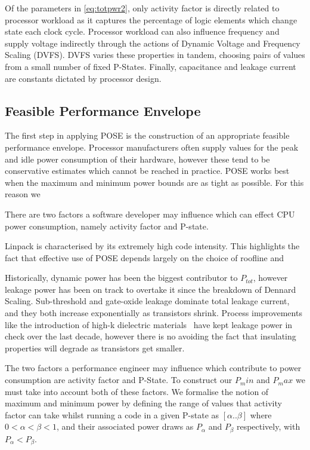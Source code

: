 Of the parameters in \autoref{eq:totpwr2}, only activity factor is directly related to processor workload as it captures the percentage of logic elements which change state each clock cycle.
 Processor workload can also influence frequency and supply voltage indirectly through the actions of Dynamic Voltage and Frequency Scaling (DVFS). 
DVFS varies these properties in tandem, choosing pairs of values from a small number of fixed P-States.
Finally, capacitance and leakage current are constants  dictated by processor design.

\subsection{Feasible Performance Envelope}
The first step in applying POSE is the construction of an appropriate feasible performance envelope.
Processor manufacturers often supply values for the peak and idle power consumption of their hardware, however these tend to be conservative estimates which cannot be reached in practice. 
POSE works best when the maximum and minimum power bounds are as tight as possible.
For this reason we 


There are two factors a software developer may influence which can effect CPU power consumption, namely activity factor and P-state.


Linpack is characterised by its extremely high code intensity. 
This highlights the fact that effective use of POSE depends largely on the choice of roofline and 

Historically, dynamic power has been the biggest contributor to $P_{tot}$, however leakage power has been on track to overtake it since the breakdown of Dennard Scaling.  Sub-threshold and gate-oxide leakage dominate total leakage current, and they both increase exponentially as transistors shrink. Process improvements like the introduction of high-k dielectric materials~\cite{jan:2009aa} have kept leakage power in check over the last decade, however there is no avoiding the fact that insulating properties will degrade as transistors get smaller.

The two factors a performance engineer may influence which contribute to power consumption are activity factor and P-State.
To construct our $P_min$ and $P_max$ we must take into account both of these factors.
We formalise the notion of maximum and minimum power by defining the range of values that activity factor can take whilst running a code in a given P-state as $[\alpha  .. \beta]$ where $0 < \alpha < \beta < 1$, and their associated power draws as $P_{\alpha}$ and $P_{\beta}$ respectively, with $P_{\alpha} < P_{\beta}$.

